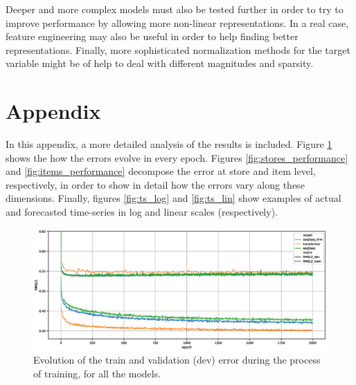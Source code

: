 \documentclass{elsarticle}
\begin{document}
	Deeper and more complex models must also be tested further in order to try to improve performance by allowing more non-linear representations. In a real case, feature engineering may also be useful in order to help finding better representations. Finally, more sophisticated normalization methods for the target variable might be of help to deal with different magnitudes and sparsity.
	
	\newpage
	
	
	
	
	\newpage
	\section*{Appendix}
	In this appendix, a more detailed analysis of the results is included. Figure \ref{fig:performance_evolution} shows the how the errors evolve in every epoch. Figures \ref{fig:stores_performance} and \ref{fig:items_performance} decompose the error at store and item level, respectively, in order to show in detail how the errors vary along these dimensions. Finally, figures \ref{fig:ts_log} and \ref{fig:ts_lin} show examples of actual and forecasted time-series in log and linear scales (respectively).
	
	\begin{figure}[h!]
		\centering
		\includegraphics[width=1\linewidth]{img/evolution}
		\caption{Evolution of the train and validation (dev) error during the process of training, for all the models.}
		\label{fig:performance_evolution}
	\end{figure}
	
\end{document}
